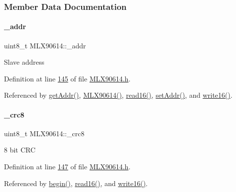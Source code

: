 \subsubsection{Member Data Documentation}
\mbox{\label{class_m_l_x90614_a768925264f76f33f9bf98aec1cbec6a9}} 
\paragraph{\texorpdfstring{\+\_\+addr}{\_addr}}
{\footnotesize\ttfamily uint8\+\_\+t M\+L\+X90614\+::\+\_\+addr\hspace{0.3cm}{\ttfamily [private]}}

Slave address 

Definition at line \mbox{\hyperlink{_m_l_x90614_8h_source_l00145}{145}} of file \mbox{\hyperlink{_m_l_x90614_8h_source}{M\+L\+X90614.\+h}}.



Referenced by \mbox{\hyperlink{_m_l_x90614_8cpp_source_l00250}{get\+Addr()}}, \mbox{\hyperlink{_m_l_x90614_8cpp_source_l00046}{M\+L\+X90614()}}, \mbox{\hyperlink{_m_l_x90614_8cpp_source_l00270}{read16()}}, \mbox{\hyperlink{_m_l_x90614_8cpp_source_l00226}{set\+Addr()}}, and \mbox{\hyperlink{_m_l_x90614_8cpp_source_l00314}{write16()}}.

\mbox{\label{class_m_l_x90614_add210d34992507e8ccb753a040b14395}} 
\paragraph{\texorpdfstring{\+\_\+crc8}{\_crc8}}
{\footnotesize\ttfamily uint8\+\_\+t M\+L\+X90614\+::\+\_\+crc8\hspace{0.3cm}{\ttfamily [private]}}

8 bit C\+RC 

Definition at line \mbox{\hyperlink{_m_l_x90614_8h_source_l00147}{147}} of file \mbox{\hyperlink{_m_l_x90614_8h_source}{M\+L\+X90614.\+h}}.



Referenced by \mbox{\hyperlink{_m_l_x90614_8cpp_source_l00068}{begin()}}, \mbox{\hyperlink{_m_l_x90614_8cpp_source_l00270}{read16()}}, and \mbox{\hyperlink{_m_l_x90614_8cpp_source_l00314}{write16()}}.

